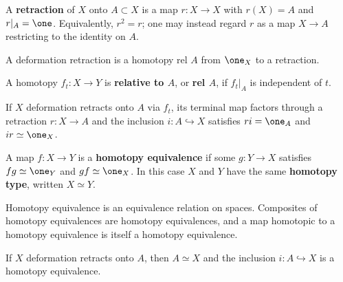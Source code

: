 \begin{definition}[Retraction]
\label{def:retraction}




A \textbf{retraction} of $X$ onto $A\subset X$ is a map $r:X\to X$ with
$r(X)=A$ and $r|_A=\one$. Equivalently, $r^2=r$; one may instead regard $r$ as
a map $X\to A$ restricting to the identity on $A$.
\end{definition}

A deformation retraction is a homotopy rel $A$ from $\one_X$ to a retraction.

\begin{definition}
\label{def:homotopy-rel-a}





A homotopy $f_t:X\to Y$ is \textbf{relative to $A$}, or \textbf{rel $A$}, if
$f_t|_A$ is independent of $t$.
\end{definition}

If $X$ deformation retracts onto $A$ via $f_t$, its terminal map factors through a
retraction $r:X\to A$ and the inclusion $i:A\hookrightarrow X$ satisfies
$ri=\one_A$ and $ir\simeq\one_X$.

\begin{definition}
\label{def:homotopy-equivalence}





A map $f:X\to Y$ is a \textbf{homotopy equivalence} if some $g:Y\to X$ satisfies
$fg\simeq\one_Y$ and $gf\simeq\one_X$. In this case $X$ and $Y$ have the same
\textbf{homotopy type}, written $X\simeq Y$.
\end{definition}

Homotopy equivalence is an equivalence relation on spaces. Composites of homotopy
equivalences are homotopy equivalences, and a map homotopic to a homotopy
equivalence is itself a homotopy equivalence.

\begin{proposition}
\label{prop:deformation-retract-homotopy-equivalence}





If $X$ deformation retracts onto $A$, then $A\simeq X$ and the inclusion
$i:A\hookrightarrow X$ is a homotopy equivalence.
\end{proposition}

